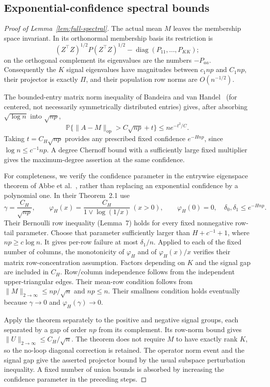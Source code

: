 \documentclass[11pt]{article}
\theoremstyle{definition}
\theoremstyle{remark}
\newcommand{\PP}{\mathbb P}
\numberwithin{equation}{section}
\begin{document}
\subsection{Exponential-confidence spectral bounds}
\label{app:general-full-spectral}
\begin{proof}[Proof of Lemma~\ref{lem:full-spectral}]
The actual mean $M$ leaves the membership space invariant. In its orthonormal membership basis its restriction is
\[
 (Z^\top Z)^{1/2}P(Z^\top Z)^{1/2}-\operatorname{diag}(P_{11},\ldots,P_{KK});
\]
on the orthogonal complement its eigenvalues are the numbers $-P_{aa}$. Consequently the $K$ signal eigenvalues have magnitudes between $c_1np$ and $C_1np$, their projector is exactly $\Pi$, and their population row norms are $O(n^{-1/2})$.

The bounded-entry matrix norm inequality of Bandeira and van Handel~\citep[Corollary~3.12 and Remark~3.13]{bandeiravhandel2016} (for centered, not necessarily symmetrically distributed entries) gives, after absorbing $\sqrt{\log n}$ into $\sqrt{np}$,
\[
 \PP\{\|A-M\|_{\mathrm{op}}>C\sqrt{np}+t\}\le n e^{-t^2/C}.
\]
Taking $t=C_H\sqrt{np}$ provides any prescribed fixed confidence $e^{-Hnp}$, since $\log n\le c^{-1}np$. A degree Chernoff bound with a sufficiently large fixed multiplier gives the maximum-degree assertion at the same confidence.

For completeness, we verify the confidence parameter in the entrywise eigenspace theorem of Abbe et al.~\citep{abbe2020}, rather than replacing an exponential confidence by a polynomial one. In their Theorem~2.1 use
\[
 \gamma=\frac{C_H}{\sqrt{np}},\qquad
 \varphi_H(x)=\frac{C_H}{1\vee\log(1/x)}\ (x>0),\qquad \varphi_H(0)=0,
 \quad \delta_0,\delta_1\le e^{-Hnp}.
\]
Their Bernoulli row inequality (Lemma~7) holds for every fixed nonnegative row-tail parameter. Choose that parameter sufficiently larger than $H+c^{-1}+1$, where $np\ge c\log n$. It gives per-row failure at most $\delta_1/n$. Applied to each of the fixed number of columns, the monotonicity of $\varphi_H$ and of $\varphi_H(x)/x$ verifies their matrix row-concentration assumption. Factors depending on $K$ and the signal gap are included in $C_H$. Row/column independence follows from the independent upper-triangular edges. Their mean-row condition follows from $\|M\|_{2\to\infty}\le np/\sqrt n$ and $np\le n$. Their smallness condition holds eventually because $\gamma\to0$ and $\varphi_H(\gamma)\to0$.

Apply the theorem separately to the positive and negative signal groups, each separated by a gap of order $np$ from its complement. Its row-norm bound gives $\|U\|_{2\to\infty}\le C_H/\sqrt n$. The theorem does not require $M$ to have exactly rank $K$, so the no-loop diagonal correction is retained. The operator norm event and the signal gap give the asserted projector bound by the usual subspace perturbation inequality. A fixed number of union bounds is absorbed by increasing the confidence parameter in the preceding steps.


\end{proof}
\end{document}
